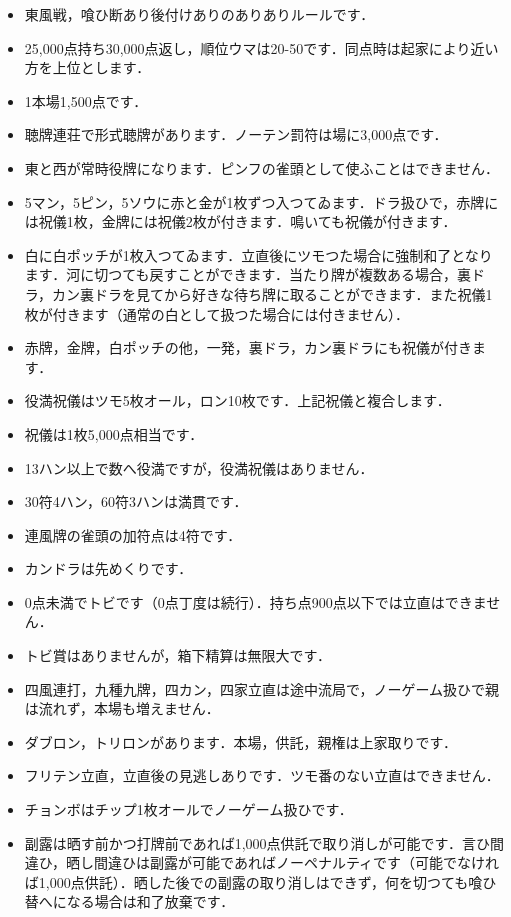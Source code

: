 \documentclass[uplatex]{jsarticle}
\begin{document}
\begin{itemize}
    \item 東風戦，喰ひ断あり後付けありのありありルールです．
    \item 25,000点持ち30,000点返し，順位ウマは20-50です．同点時は起家により近い方を上位とします．
    \item 1本場1,500点です．
    \item 聴牌連荘で形式聴牌があります．ノーテン罰符は場に3,000点です．
    \item 東と西が常時役牌になります．ピンフの雀頭として使ふことはできません．
    \item 5マン，5ピン，5ソウに赤と金が1枚ずつ入つてゐます．ドラ扱ひで，赤牌には祝儀1枚，金牌には祝儀2枚が付きます．鳴いても祝儀が付きます．
    \item 白に白ポッチが1枚入つてゐます．立直後にツモつた場合に強制和了となります．河に切つても戻すことができます．当たり牌が複数ある場合，裏ドラ，カン裏ドラを見てから好きな待ち牌に取ることができます．また祝儀1枚が付きます（通常の白として扱つた場合には付きません）．
    \item 赤牌，金牌，白ポッチの他，一発，裏ドラ，カン裏ドラにも祝儀が付きます．
    \item 役満祝儀はツモ5枚オール，ロン10枚です．上記祝儀と複合します．
    \item 祝儀は1枚5,000点相当です．
    \item 13ハン以上で数へ役満ですが，役満祝儀はありません．
    \item 30符4ハン，60符3ハンは満貫です．
    \item 連風牌の雀頭の加符点は4符です．
    \item カンドラは先めくりです．
    \item 0点未満でトビです（0点丁度は続行）．持ち点900点以下では立直はできません．
    \item トビ賞はありませんが，箱下精算は無限大です．
    \item 四風連打，九種九牌，四カン，四家立直は途中流局で，ノーゲーム扱ひで親は流れず，本場も増えません．
    \item ダブロン，トリロンがあります．本場，供託，親権は上家取りです．
    \item フリテン立直，立直後の見逃しありです．ツモ番のない立直はできません．
    \item チョンボはチップ1枚オールでノーゲーム扱ひです．
    \item 副露は晒す前かつ打牌前であれば1,000点供託で取り消しが可能です．言ひ間違ひ，晒し間違ひは副露が可能であればノーペナルティです（可能でなければ1,000点供託）．晒した後での副露の取り消しはできず，何を切つても喰ひ替へになる場合は和了放棄です．

\end{itemize}
\end{document}
